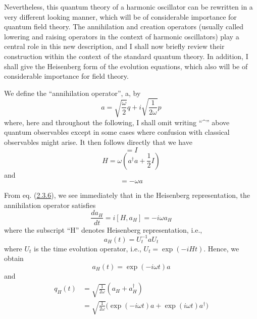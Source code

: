 \documentclass[11pt,a4paper]{article}
\begin{document}
Nevertheless, this quantum theory of a harmonic oscillator can be rewritten in a very different looking manner, which will be of considerable importance for quantum field theory. The annihilation and creation operators (usually called lowering and raising operators in the context of harmonic oscillators) play a central role in this new description, and I shall now briefly review their construction within the context of the standard quantum theory. In addition, I shall give the Heisenberg form of the evolution equations, which also will be of considerable importance for field theory.

We define the ``annihilation operator'', a, by
\begin{equation*}
a = \sqrt{\frac{\omega}{2}} q + i \sqrt{\frac{1}{2\omega}} p \tag{2.3.3}\label{eq:2.3.3}
\end{equation*}
where, here and throughout the following, I shall omit writing ``\^{}'' above quantum observables except in some cases where confusion with classical observables might arise. It then follows directly that we have
\begin{equation*}
[a, a^{\dagger}] = I \tag{2.3.4}\label{eq:2.3.4}
\end{equation*}
\begin{equation*}
H = \omega \left(a^{\dagger} a + \frac{1}{2} I\right) \tag{2.3.5}\label{eq:2.3.5}
\end{equation*}
and
\begin{equation*}
[H, a] = -\omega a \tag{2.3.6}\label{eq:2.3.6}
\end{equation*}

From eq. (\hyperref[eq:2.3.6]{2.3.6}), we see immediately that in the Heisenberg representation, the annihilation operator satisfies
\begin{equation*}
\frac{da_H}{dt} = i[H, a_H] = -i\omega a_H \tag{2.3.7}\label{eq:2.3.7}
\end{equation*}
where the subscript ``H'' denotes Heisenberg representation, i.e.,
\begin{equation*}
a_{H}(t) = U_{t}^{-1} a U_{t} \tag{2.3.8}\label{eq:2.3.8}
\end{equation*} \hypertarget{source-36}{} where \(U_t\) is the time evolution operator, i.e., \(U_t = \exp(-iHt)\). Hence, we obtain
\begin{equation*}
a_{H}(t) = \exp(-i\omega t) a \tag{2.3.9}\label{eq:2.3.9}
\end{equation*}
and
\begin{equation*}
\begin{aligned} q_H(t) &= \sqrt{\frac{1}{2\omega}}(a_H+a_H^\dagger) \\ &= \sqrt{\frac{1}{2\omega}}\bigl(\exp(-i\omega t)a+\exp(i\omega t)a^\dagger\bigr) \end{aligned} \tag{2.3.10}\label{eq:2.3.10}
\end{equation*}
\end{document}
